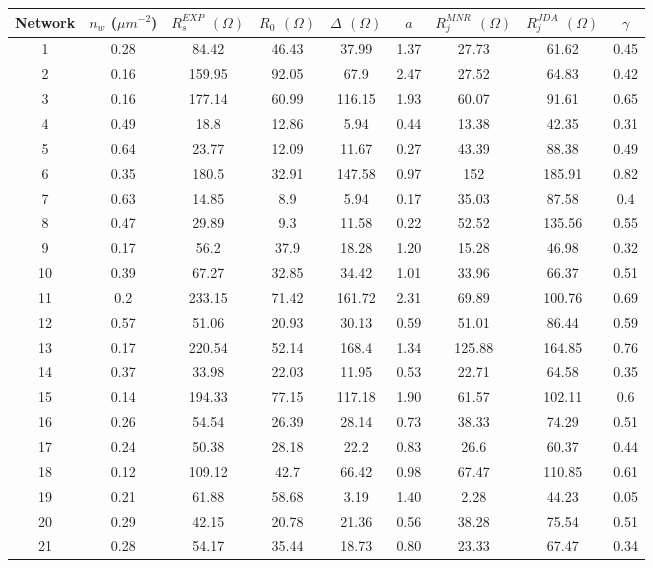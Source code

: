 \begin{table}
\begin{center}
\begin{tabular}{| c | c c c c c c c c |}
\hline
Network & $n_w$ ($\mu m^{-2}$) & $R_s^{EXP}$ $(\Omega)$& $R_0$ $(\Omega)$ & $\Delta$ $(\Omega)$& $a$ & $R_j^{MNR}$ $(\Omega)$& $ R_j^{JDA}$ $(\Omega)$& $\gamma$ \\ 
\hline
1 & 0.28 & 84.42 & 46.43 & 37.99 & 1.37 & 27.73 & 61.62 & 0.45 \\ 
2 & 0.16 & 159.95 & 92.05 & 67.9 & 2.47 & 27.52 & 64.83 & 0.42 \\ 
3 & 0.16 & 177.14 & 60.99 & 116.15 & 1.93 & 60.07 & 91.61 & 0.65 \\ 
4 & 0.49 & 18.8 & 12.86 & 5.94 & 0.44 & 13.38 & 42.35 & 0.31 \\ 
5 & 0.64 & 23.77 & 12.09 & 11.67 & 0.27 & 43.39 & 88.38 & 0.49 \\ 
6 & 0.35 & 180.5 & 32.91 & 147.58 & 0.97 & 152 & 185.91 & 0.82 \\ 
7 & 0.63 & 14.85 & 8.9 & 5.94 & 0.17 & 35.03 & 87.58 & 0.4 \\ 
8 & 0.47 & 29.89 & 9.3 & 11.58 & 0.22 & 52.52 & 135.56 & 0.55 \\ 
9 & 0.17 & 56.2 & 37.9 & 18.28 & 1.20 & 15.28 & 46.98 & 0.32 \\ 
10 & 0.39 & 67.27 & 32.85 & 34.42 & 1.01 & 33.96 & 66.37 & 0.51 \\ 
11 & 0.2 & 233.15 & 71.42 & 161.72 & 2.31 & 69.89 & 100.76 & 0.69 \\ 
12 & 0.57 & 51.06 & 20.93 & 30.13 & 0.59 & 51.01 & 86.44 & 0.59 \\ 
13 & 0.17 & 220.54 & 52.14 & 168.4 & 1.34 & 125.88 & 164.85 & 0.76 \\ 
14 & 0.37 & 33.98 & 22.03 & 11.95 & 0.53 & 22.71 & 64.58 & 0.35 \\ 
15 & 0.14 & 194.33 & 77.15 & 117.18 & 1.90 & 61.57 & 102.11 & 0.6 \\ 
16 & 0.26 & 54.54 & 26.39 & 28.14 & 0.73 & 38.33 & 74.29 & 0.51 \\ 
17 & 0.24 & 50.38 & 28.18 & 22.2 & 0.83 & 26.6 & 60.37 & 0.44 \\ 
18 & 0.12 & 109.12 & 42.7 & 66.42 & 0.98 & 67.47 & 110.85 & 0.61 \\ 
19 & 0.21 & 61.88 & 58.68 & 3.19 & 1.40 & 2.28 & 44.23 & 0.05 \\ 
20 & 0.29 & 42.15 & 20.78 & 21.36 & 0.56 & 38.28 & 75.54 & 0.51 \\ 
21 & 0.28 & 54.17 & 35.44 & 18.73 & 0.80 & 23.33 & 67.47 & 0.34 \\ 

\end{tabular}
\end{center}
\end{table}
